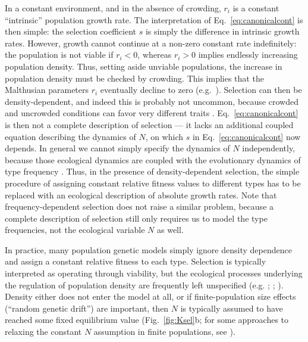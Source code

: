 \documentclass[12pt]{article}
\begin{document}
In a constant environment, and in the absence of crowding, $r_i$ is a constant ``intrinsic'' population growth rate. The interpretation of Eq.~\eqref{eq:canonicalcont} is then simple: the selection coefficient $s$ is simply the difference in intrinsic growth rates. However, growth cannot continue at a non-zero constant rate indefinitely: the population is not viable if $r_i<0$, whereas  $r_i>0$ implies endlessly increasing population density. Thus, setting aside unviable populations, the increase in population density must be checked by crowding. This implies that the Malthusian parameters $r_i$ eventually decline to zero (e.g.~\citealt[pp. 203]{begon_1990}). Selection can then be density-dependent, and indeed this is probably not uncommon, because crowded and uncrowded conditions can favor very different traits \citep{travis_2013}. Eq.~\eqref{eq:canonicalcont} is then not a complete description of selection --- it lacks an additional coupled equation describing the dynamics of $N$, on which $s$ in Eq.~\eqref{eq:canonicalcont} now depends. In general we cannot simply specify the dynamics of $N$ independently, because those ecological dynamics are coupled with the evolutionary dynamics of type frequency \citep{travis_2013}. Thus, in the presence of density-dependent selection, the simple procedure of assigning constant relative fitness values to different types has to be replaced with an ecological description of absolute growth rates. Note that frequency-dependent selection does not raise a similar problem, because a complete description of selection still only requires us to model the type frequencies, not the ecological variable $N$ as well. 

In practice, many population genetic models simply ignore density dependence and assign a constant relative fitness to each type. Selection is typically interpreted as operating through viability, but the ecological processes underlying the regulation of population density are frequently left unspecified (e.g. \citealt{gillespie_2004}; \citealt{nagylaki_1992}; \citealt{ewens_2004}). Density either does not enter the model at all, or if finite-population size effects (``random genetic drift'') are important, then $N$ is typically assumed to have reached some fixed equilibrium value (Fig.~\ref{fig:Ksel}b; for some approaches to relaxing the constant $N$ assumption in finite populations, see \citealt{lambert_2005,parsons_2007,chotibut_2017,constable_2017}). 
\end{document}
